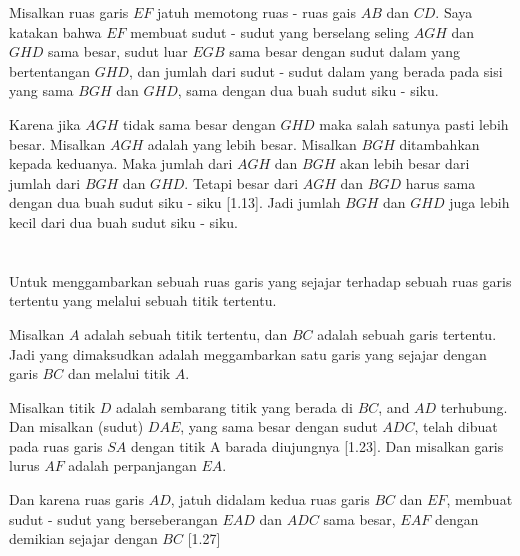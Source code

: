 \documentclass[a4paper, 12pt]{book}
\begin{document}

Misalkan ruas garis $EF$ jatuh memotong ruas - ruas gais $AB$ dan $CD$. 
Saya katakan bahwa $EF$ membuat sudut - sudut yang berselang seling 
$AGH$ dan $GHD$ sama besar, sudut luar $EGB$ sama besar dengan sudut dalam
yang bertentangan $GHD$, dan jumlah dari sudut - sudut dalam yang berada 
pada sisi yang sama $BGH$ dan $GHD$, sama dengan dua buah sudut siku - siku.

Karena jika $AGH$ tidak sama besar dengan $GHD$ maka salah satunya pasti
lebih besar. Misalkan $AGH$ adalah yang lebih besar. Misalkan $BGH$ 
ditambahkan kepada keduanya. Maka jumlah dari $AGH$ dan $BGH$ akan 
lebih besar dari jumlah dari $BGH$ dan $GHD$. Tetapi besar dari $AGH$
dan $BGD$ harus sama dengan dua buah sudut siku - siku [1.13]. Jadi
jumlah $BGH$ dan $GHD$ juga lebih kecil dari dua buah sudut siku - siku.

\setcounter{section}{31}
\section*{\centering \thesection} 
Untuk menggambarkan sebuah ruas garis yang sejajar terhadap sebuah ruas 
garis tertentu yang melalui sebuah titik tertentu.


Misalkan $A$ adalah sebuah titik tertentu, dan $BC$ adalah sebuah garis tertentu. Jadi
yang dimaksudkan adalah meggambarkan satu garis yang sejajar dengan garis $BC$ 
dan melalui titik $A$.

Misalkan titik $D$ adalah sembarang titik yang berada di $BC$, and $AD$ terhubung. 
Dan misalkan (sudut) $DAE$, yang sama besar dengan sudut $ADC$, telah dibuat 
pada ruas garis $SA$ dengan titik A barada diujungnya [1.23]. Dan misalkan garis
lurus $AF$ adalah perpanjangan $EA$.

Dan karena ruas garis $AD$, jatuh didalam  kedua ruas garis $BC$ dan $EF$, membuat 
sudut - sudut yang berseberangan $EAD$ dan $ADC$ sama besar, $EAF$ dengan demikian
sejajar dengan $BC$ [1.27]
\end{document}
